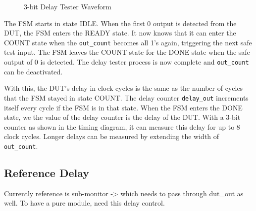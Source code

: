 \begin{figure}[H]
  \centering
  
  \caption{3-bit Delay Tester Waveform}
  \label{DelayTesterWF}
\end{figure}

The FSM starts in state IDLE.
When the first 0 output is detected from the DUT, the FSM enters the READY state.
It now knows that it can enter the COUNT state when the \texttt{out\_count} becomes all 1's again, triggering the next safe test input.
The FSM leaves the COUNT state for the DONE state when the safe output of 0 is detected.
The delay tester process is now complete and \texttt{out\_count} can be deactivated.

With this, the DUT's delay in clock cycles is the same as the number of cycles that the FSM stayed in state COUNT.
The delay counter \texttt{delay\_out} increments itself every cycle if the FSM is in that state.
When the FSM enters the DONE state, we the value of the delay counter is the delay of the DUT.
With a 3-bit counter as shown in the timing diagram, it can measure this delay for up to 8 clock cycles.
Longer delays can be measured by extending the width of \texttt{out\_count}.

\subsection{Reference Delay}
Currently reference is sub-monitor -> which needs to pass through dut\_out as well.
To have a pure module, need this delay control.